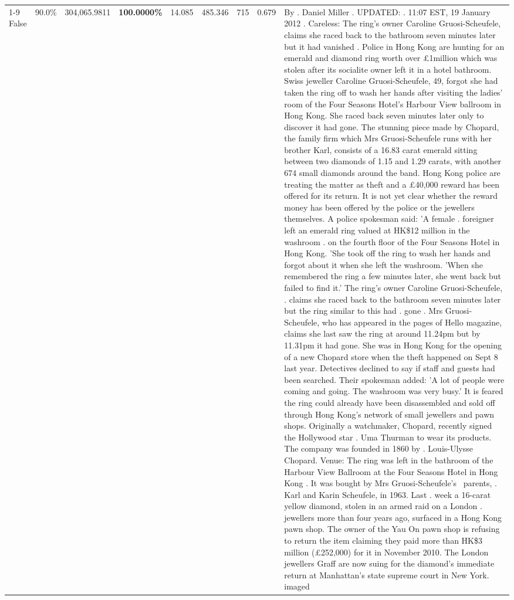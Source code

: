\begin{table}[H]
\begin{tabular}{lllrlllll}
\cline{1-9}
False & 90.0\% & 304,065.9811 & \bfseries \color{red} 100.0000\% & 14.085 & 485.346 & 715 & 0.679 & By . Daniel Miller . UPDATED: . 11:07 EST, 19 January 2012 . Careless: The ring's owner Caroline Gruosi-Scheufele, claims she raced back to the bathroom seven minutes later but it had vanished . Police in Hong Kong are hunting for an emerald and diamond ring worth over £1million which was stolen after its socialite owner left it in a hotel bathroom. Swiss jeweller Caroline Gruosi-Scheufele, 49, forgot she had taken the ring off to wash her hands after visiting the ladies' room of the Four Seasons Hotel's Harbour View ballroom in Hong Kong. She raced back seven minutes later only to discover it had gone. The stunning piece made by Chopard, the family firm which Mrs Gruosi-Scheufele runs with her brother Karl, consists of a 16.83 carat emerald sitting between two diamonds of 1.15 and 1.29 carats, with another 674 small diamonds around the band. Hong Kong police are treating the matter as theft and a £40,000 reward has been offered for its return. It is not yet clear whether the reward money has been offered by the police or the jewellers themselves. A police spokesman said: 'A female . foreigner left an emerald ring valued at HK\$12 million in the washroom . on the fourth floor of the Four Seasons Hotel in Hong Kong. 'She took off the ring to wash her hands and forgot about it when she left the washroom. 'When she remembered the ring a few minutes later, she went back but failed to find it.' The ring's owner Caroline Gruosi-Scheufele, . claims she raced back to the bathroom seven minutes later but the ring similar to this had . gone . Mrs Gruosi-Scheufele, who has appeared in the pages of Hello magazine, claims she last saw the ring at around 11.24pm but by 11.31pm it had gone. She was in Hong Kong for the opening of a new Chopard store when the theft happened on Sept 8 last year. Detectives declined to say if staff and guests had been searched. Their spokesman added: 'A lot of people were coming and going. The washroom was very busy.' It is feared the ring could already have been disassembled and sold off through Hong Kong's network of small jewellers and pawn shops. Originally a watchmaker, Chopard, recently signed the Hollywood star . Uma Thurman to wear its products. The company was founded in 1860 by . Louis-Ulysse Chopard. Venue: The ring was left in the bathroom of the Harbour View Ballroom at the Four Seasons Hotel in Hong Kong . It was bought by Mrs Gruosi-Scheufele's  parents, . Karl and Karin Scheufele, in 1963. Last . week a 16-carat yellow diamond, stolen in an armed raid on a London . jewellers more than four years ago, surfaced in a Hong Kong pawn shop. The owner of the Yau On pawn shop is refusing to return the item claiming they paid more than HK\$3 million (£252,000) for it in November 2010. The London jewellers Graff are now suing for the diamond’s immediate return at Manhattan’s state supreme court in New York. imaged \\

\end{tabular}
\end{table}
